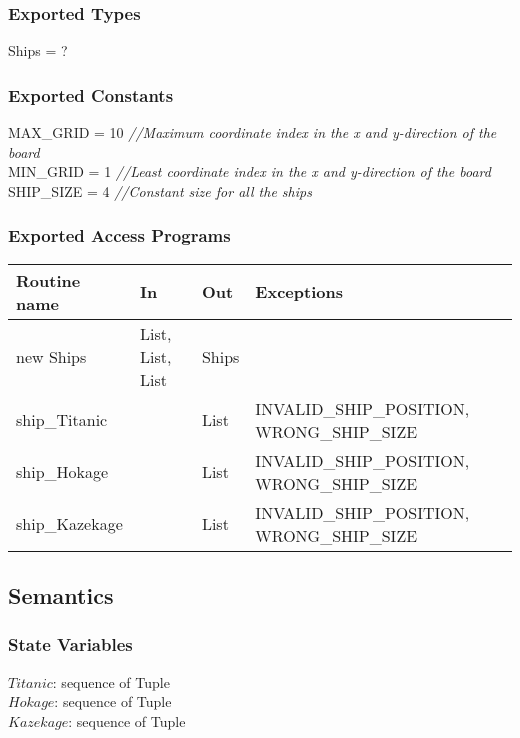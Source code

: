 \documentclass[12pt]{article}
\begin{document}
\subsubsection* {Exported Types}

Ships = ?

\subsubsection* {Exported Constants}

MAX\_GRID = 10 {\it //Maximum coordinate index in the x and y-direction of the board}\\
MIN\_GRID = 1   {\it //Least coordinate index in the x and y-direction of the board}\\
SHIP\_SIZE = 4  {\it //Constant size for all the ships }\\

\subsubsection* {Exported Access Programs}

\begin{tabular}{| l | l | l | l |}
\hline
\textbf{Routine name} & \textbf{In} & \textbf{Out} & \textbf{Exceptions}\\
\hline
new Ships & List, List, List & Ships & ~\\
\hline
ship\_Titanic & ~ & List & INVALID\_SHIP\_POSITION, WRONG\_SHIP\_SIZE\\
\hline
ship\_Hokage & ~ & List & INVALID\_SHIP\_POSITION, WRONG\_SHIP\_SIZE\\
\hline
ship\_Kazekage & ~ & List & INVALID\_SHIP\_POSITION, WRONG\_SHIP\_SIZE\\
\hline
\end{tabular}

\subsection* {Semantics}

\subsubsection* {State Variables}

$Titanic$: sequence of Tuple\\
$Hokage$: sequence of Tuple\\
$Kazekage$: sequence of Tuple\\
\end{document}
